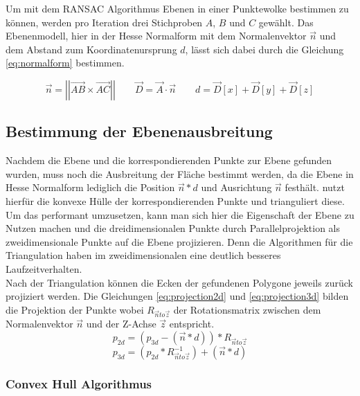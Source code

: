 Um mit dem RANSAC Algorithmus Ebenen in einer Punktewolke bestimmen zu können, werden pro Iteration drei Stichproben \(A\), \(B\) und \(C\) gewählt. Das Ebenenmodell, hier in der Hesse Normalform mit dem Normalenvektor \(\vec{n}\) und dem Abstand zum Koordinatenursprung \(d\), lässt sich dabei durch die Gleichung \ref{eq:normalform} bestimmen.

\begin{equation}\label{eq:normalform}
\vec{n} =\left|\left| \vec{AB} \times \vec{AC}\right|\right|
\qquad
\vec{D} = \vec{A} \cdot \vec{n}
\qquad
d = \vec{D}\left[x\right] + \vec{D}\left[y\right] + \vec{D}\left[z\right]
\end{equation}

\subsection{Bestimmung der Ebenenausbreitung}

Nachdem die Ebene und die korrespondierenden Punkte zur Ebene gefunden wurden, muss noch die Ausbreitung der Fläche bestimmt werden, da die Ebene in Hesse Normalform lediglich die Position \(\vec{n} * d\) und Ausrichtung \(\vec{n}\) festhält. \citet{PlanarSurfaceMapping} nutzt hierfür die konvexe Hülle der korrespondierenden Punkte und trianguliert diese. Um das performant umzusetzen, kann man sich hier die Eigenschaft der Ebene zu Nutzen machen und die dreidimensionalen Punkte durch Parallelprojektion als zweidimensionale Punkte auf die Ebene projizieren. Denn die Algorithmen für die Triangulation haben im zweidimensionalen eine deutlich besseres Laufzeitverhalten. \\

Nach der Triangulation können die Ecken der gefundenen Polygone jeweils zurück projiziert werden. Die Gleichungen \ref{eq:projection2d} und \ref{eq:projection3d} bilden die Projektion der Punkte wobei \(R_{\vec{n}to\vec{z}}\) der Rotationsmatrix zwischen dem Normalenvektor \(\vec{n}\) und der Z-Achse \(\vec{z}\) entspricht.\\

\begin{equation} \label{eq:projection2d}
p_{2d} = (p_{3d} - (\vec{n}*d)) * R_{\vec{n}to\vec{z}}
\end{equation}
\begin{equation} \label{eq:projection3d}
p_{3d} = (p_{2d} * R_{\vec{n}to\vec{z}}^{-1}) + (\vec{n}*d)
\end{equation}

\subsubsection{Convex Hull Algorithmus}

